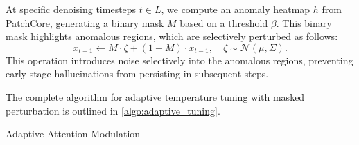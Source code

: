 At specific denoising timesteps $t \in L$, we compute an anomaly heatmap $h$ from PatchCore, generating a binary mask $M$ based on a threshold $\beta$. 
This binary mask highlights anomalous regions, which are selectively perturbed as follows: 
\begin{equation}
    x_{t-1} \leftarrow M \cdot \zeta + (1-M) \cdot x_{t-1}, \quad \zeta \sim \mathcal{N}(\mu, \Sigma).
\end{equation}
This operation introduces noise selectively into the anomalous regions, preventing early-stage hallucinations from persisting in subsequent steps.

The complete algorithm for adaptive temperature tuning with masked perturbation is outlined in \cref{algo:adaptive_tuning}.

\begin{algorithm} 
\caption{Adaptive Attention Modulation}
\label{algo:adaptive_tuning}




\end{algorithm}